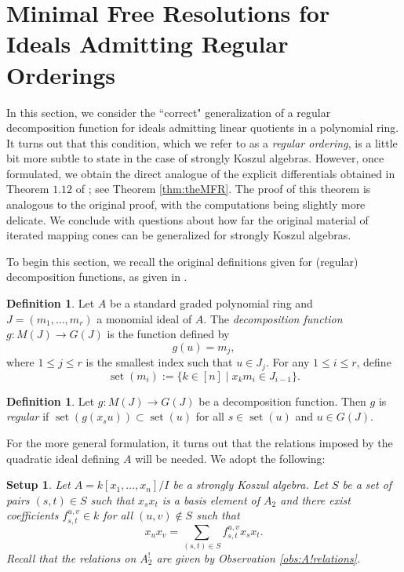 \documentclass[10pt]{amsart}
\newtheorem{setup}[theorem]{Setup}
\theoremstyle{definition}
\newtheorem{definition}[theorem]{Definition}
\theoremstyle{remark}
\newtheorem{the context}[theorem]{The Context}
\numberwithin{equation}{theorem}
\numberwithin{equation}{section}
\renewcommand{\leq}{\leqslant}
\newcommand{\set}{\operatorname{set}}
\begin{document}
\section{Minimal Free Resolutions for Ideals Admitting Regular Orderings}\label{sec:theMFRforRegular}

In this section, we consider the ``correct" generalization of a regular decomposition function for ideals admitting linear quotients in a polynomial ring. It turns out that this condition, which we refer to as a \emph{regular ordering}, is a little bit more subtle to state in the case of strongly Koszul algebras. However, once formulated, we obtain the direct analogue of the explicit differentials obtained in Theorem $1.12$ of \cite{herzog2002resolutions}; see Theorem \ref{thm:theMFR}. The proof of this theorem is analogous to the original proof, with the computations being slightly more delicate. We conclude with questions about how far the original material of iterated mapping cones can be generalized for strongly Koszul algebras.

To begin this section, we recall the original definitions given for (regular) decomposition functions, as given in \cite{herzog2002resolutions}.

\begin{definition}\label{def:decompFunc}
Let $A$ be a standard graded polynomial ring and $J = (m_1 , \dots , m_r)$ a monomial ideal of $A$. The \emph{decomposition function} $g : M(J) \to G(J)$ is the function defined by
$$g(u) = m_j,$$
where $1 \leq j \leq r$ is the smallest index such that $u \in J_j$. For any $1 \leq i \leq r$, define
$$\set (m_i) := \{ k \in [n] \mid x_k m_i \in J_{i-1} \}.$$
\end{definition}

\begin{definition}\label{def:regularDecomp}
Let $g : M(J) \to G(J)$ be a decomposition function. Then $g$ is \emph{regular} if $\set (g(x_s u)) \subset \set (u)$ for all $s \in \set (u)$ and $u \in G(J)$. 
\end{definition}

For the more general formulation, it turns out that the relations imposed by the quadratic ideal defining $A$ will be needed. We adopt the following:

\begin{setup}\label{set:strongKoszulRegular}
Let $A = k[x_1 , \dots , x_n] /I$ be a strongly Koszul algebra. Let $S$ be a set of pairs $(s,t) \in S$ such that $x_s x_t$ is a basis element of $A_2$ and there exist coefficients $f^{u,v}_{s,t} \in k$ for all $(u,v) \notin S$ such that
$$x_u x_v = \sum_{(s,t) \in S} f^{u,v}_{s,t} x_s x_t.$$
Recall that the relations on $A^!_2$ are given by Observation \ref{obs:A!relations}.
\end{setup}
\end{document}
